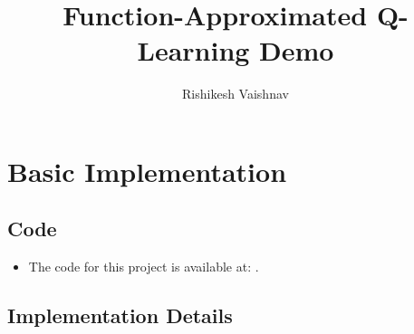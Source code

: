 \documentclass[a4paper]{article}
\title{Function-Approximated Q-Learning Demo}
\author{Rishikesh Vaishnav}
\begin{document}
\maketitle
\section*{Basic Implementation}
\subsection*{Code}
\begin{itemize}
    \item The code for this project is available at: 
    \url{}.
\end{itemize}
\subsection*{Implementation Details}
\end{document}
